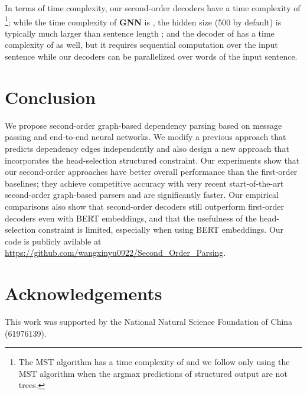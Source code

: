 \documentclass[11pt,a4paper]{article}
\begin{document}
In terms of time complexity, our second-order decoders have a time complexity of \footnote{The MST algorithm has a time complexity of  and we follow \citet{dozat-etal-2017-stanfords} only using the MST algorithm when the argmax predictions of structured output are not trees.}; while the time complexity of \textbf{GNN} is , the hidden size  (500 by default) is typically much larger than sentence length ; and the decoder of \citet{zhang2020efficient} has a time complexity of  as well, but it requires sequential computation over the input sentence while our decoders can be parallelized over words of the input sentence. 


\section{Conclusion}
We propose second-order graph-based dependency parsing based on message passing and end-to-end neural networks. We modify a previous approach that predicts dependency edges independently and also design a new approach that incorporates the head-selection structured constraint. Our experiments show that our second-order approaches have better overall performance than the first-order baselines; they achieve competitive accuracy with very recent start-of-the-art second-order graph-based parsers and are significantly faster. Our empirical comparisons also show that second-order decoders still outperform first-order decoders even with BERT embeddings, and that the usefulness of the head-selection constraint is limited, especially when using BERT embeddings. Our code is publicly avilable at \url{https://github.com/wangxinyu0922/Second_Order_Parsing}.

\section*{Acknowledgements}
This work was supported by the National Natural Science Foundation of China (61976139).




\end{document}
